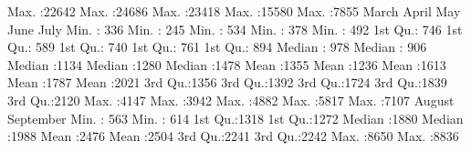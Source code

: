\documentclass{article}
\begin{document}
\begin{Schunk}
\begin{Soutput}
 Max.   :22642   Max.   :24686   Max.   :23418   Max.   :15580   Max.   :7855  
     March          April           May            June           July     
 Min.   : 336   Min.   : 245   Min.   : 534   Min.   : 378   Min.   : 492  
 1st Qu.: 746   1st Qu.: 589   1st Qu.: 740   1st Qu.: 761   1st Qu.: 894  
 Median : 978   Median : 906   Median :1134   Median :1280   Median :1478  
 Mean   :1355   Mean   :1236   Mean   :1613   Mean   :1787   Mean   :2021  
 3rd Qu.:1356   3rd Qu.:1392   3rd Qu.:1724   3rd Qu.:1839   3rd Qu.:2120  
 Max.   :4147   Max.   :3942   Max.   :4882   Max.   :5817   Max.   :7107  
     August       September   
 Min.   : 563   Min.   : 614  
 1st Qu.:1318   1st Qu.:1272  
 Median :1880   Median :1988  
 Mean   :2476   Mean   :2504  
 3rd Qu.:2241   3rd Qu.:2242  
 Max.   :8650   Max.   :8836  
\end{Soutput}
\end{Schunk}
\end{document}
